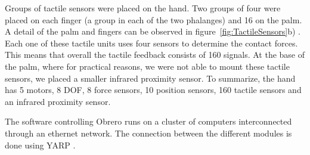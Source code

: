 Groups of tactile sensors were placed on the hand. Two
groups of four were placed on each finger (a group in each of the
two phalanges) and 16 on the palm. A detail of the palm and
fingers can be observed in figure~\ref{fig:TactileSensors}b) . Each
one of these tactile units uses four sensors to determine the
contact forces. This means that overall the tactile feedback 
consists of 160 signals. At the base of the palm, where for
practical reasons, we were not able to mount these tactile
sensors, we placed a smaller infrared proximity sensor. To
summarize, the hand has 5 motors, 8 DOF, 8 force sensors, 10
position sensors, 160 tactile sensors and an infrared proximity
sensor.

The software controlling Obrero runs on a cluster of computers
interconnected through an ethernet network. The connection between
the different modules is done using YARP \cite{yarpPaper}.
